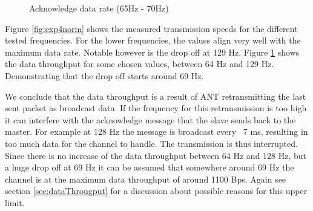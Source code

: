 \begin{description}
\begin{figure}[H]
		\caption{Acknowledge data rate (65Hz - 70Hz)}\label{fig:exp4between}
	\end{figure}
	
	Figure \ref{fig:exp4norm} shows the measured transmission speeds for the different tested frequencies. For the lower frequencies, the values align very well with the maximum data rate. Notable however is the drop off at 129 Hz. Figure \ref{fig:exp4between} shows the data throughput for some chosen values, between 64 Hz and 129 Hz. Demonstrating that the drop off starts around 69 Hz. 
	
	We conclude that the data throughput is a result of ANT retransmitting the last sent packet as broadcast data. If the frequency for this retransmission is too high it can interfere with the acknowledge message that the slave sends back to the master. For example at 128 Hz the message is broadcast every ~7 ms, resulting in too much data for the channel to handle. The transmission is thus interrupted. 
	Since there is no increase of the data throughput between 64 Hz and 128 Hz, but a huge drop off at 69 Hz it can be assumed that somewhere around 69 Hz the channel is at the maximum data throughput of around 1100 Bps. Again see section \ref{sec:dataThrougput} for a discussion about possible reasons for this upper limit. 	
\end{description}
\newpage

